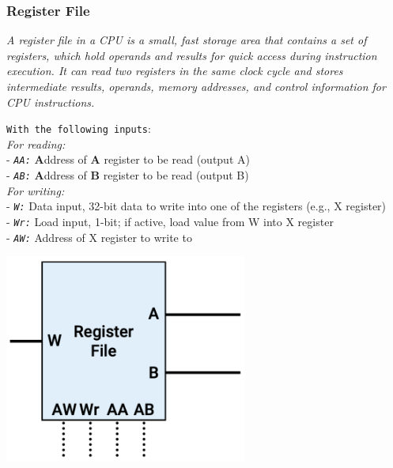 \documentclass[12pt,openany]{book}
\begin{document}
\subsubsection{Register File}
\footnotesize
\textit{A register file in a CPU is a small, fast storage area that contains a set of registers, which hold operands and results for quick access during instruction execution. It can read two registers in the same clock cycle and stores \textit{intermediate results}, \textit{operands}, \textit{memory addresses}, and \textit{control information} for CPU instructions.} \newline
\begin{minipage}[htp]{0.55\textwidth}
\footnotesize
\vspace*{5px}
\texttt{With the following inputs}:\\
\textit{For reading: }\\
- \texttt{\textit{AA:}} \textbf{A}ddress of \textbf{A} register to be read (output A) \\
- \texttt{\textit{AB:}} \textbf{A}ddress of \textbf{B} register to be read (output B) \\
\vspace*{5px}
\textit{For writing: }\\
- \texttt{\textit{W:}} Data input, 32-bit data to write into one of the registers (e.g., X register) \\
- \texttt{\textit{Wr:}} Load input, 1-bit; if active, load value from W into X register \\
- \texttt{\textit{AW:}} Address of X register to write to \\
\end{minipage}
\hfill
\vline
\hfill
\begin{minipage}[htp]{0.4\textwidth}
	\begin{center}
		\includegraphics[width=0.6\textwidth]{circuits/19.4.1_2.png}
	\end{center}
\end{minipage}
\end{document}
